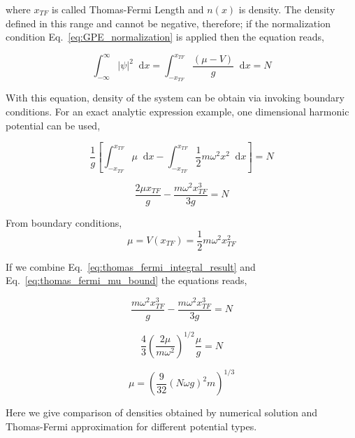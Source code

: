 \documentclass[a4paper,times,hidelinks,12pt]{article}
\newcommand*\dif{\mathop{}\!\mathrm{d}}
\begin{document}
\noindent where $x_{TF}$ is called Thomas-Fermi Length and $n(x)$ is density. The density defined in this range and cannot be negative, therefore; if the normalization condition Eq.~\eqref{eq:GPE_normalization} is applied then the equation reads,  

\begin{equation}
    \label{eq:thomas_fermi_mu_integral}
        \int_{-\infty}^{\infty} |\psi|^2 \dif x = \int_{-x_{TF}}^{x_{TF}} \frac{(\mu - V)}{g} \dif x = N 
    \end{equation}

\noindent With this equation, density of the system can be obtain via invoking boundary conditions. For an exact analytic expression example, one dimensional harmonic potential can be used, 

\begin{equation}
   \frac{1}{g} \left [ \int_{-x_{TF}}^{x_{TF}} \mu \dif x - \int_{-x_{TF}}^{x_{TF}} \frac{1}{2}m\omega^2x^2 \dif x \right ] = N
\end{equation}

\begin{equation}
\label{eq:thomas_fermi_integral_result}
    \frac{2\mu x_{TF}}{g} - \frac{m\omega^2 x_{TF}^3}{3g} = N
\end{equation}


\noindent From boundary conditions,
\begin{equation}
\label{eq:thomas_fermi_mu_bound}
    \mu = V(x_{TF}) = \frac{1}{2}m\omega^2x_{TF}^2    
\end{equation}


\noindent If we combine Eq.~\eqref{eq:thomas_fermi_integral_result} and Eq.~\eqref{eq:thomas_fermi_mu_bound} the equations reads,

\begin{equation}
    \frac{m\omega^2 x_{TF}^3}{g} - \frac{m\omega^2 x_{TF}^3}{3g} = N
\end{equation}


\begin{equation}
    \frac{4}{3} \left( \frac{2\mu}{m\omega^2} \right)^{1/2} \frac{\mu}{g} = N
\end{equation}

\begin{equation}
    \mu = \left(\frac{9}{32} (N\omega g)^2 m \right)^{1/3}
\end{equation}

\noindent Here we give comparison of densities obtained by numerical solution and Thomas-Fermi approximation for different potential types. 
\end{document}
